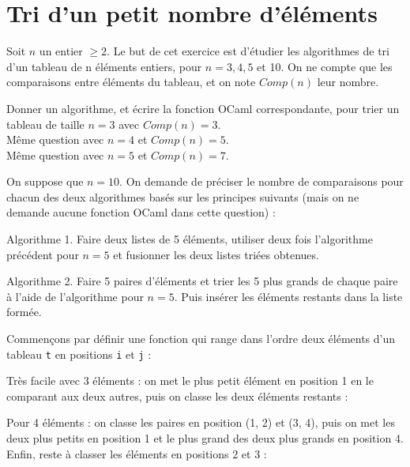 \renewcommand{\SourceFile}{1-parcours-de-tableaux/src/1-5.ml}

\section{Tri d'un petit nombre d'éléments}

Soit $n$ un entier $\geq 2$. Le but de cet exercice est d'étudier les algorithmes de tri d'un tableau de n éléments entiers, pour $n=3,4,5$ et 10. On ne compte que les comparaisons entre éléments du tableau, et on note $Comp(n)$ leur nombre.

\Q
Donner un algorithme, et écrire la fonction OCaml correspondante, pour trier un tableau de taille $n=3$ avec $Comp(n)=3$.\\
Même question avec $n=4$ et $Comp(n)=5$.\\
Même question avec $n=5$ et $Comp(n)=7$.

\Q
On suppose que $n=10$. On demande de préciser le nombre de comparaisons pour chacun des deux algorithmes basés sur les principes suivants (mais on ne demande aucune fonction OCaml dans cette question) :
\medskip

Algorithme 1. Faire deux listes de 5 éléments, utiliser deux fois l'algorithme précédent pour $n=5$ et fusionner les deux listes triées obtenues.
\medskip

Algorithme 2. Faire 5 paires d'éléments et trier les 5 plus grands de chaque paire à l'aide de l'algorithme pour $n=5$. Puis insérer les éléments restants dans la liste formée.

\Corrige
\vspace{.6cm}

Commençons par définir une fonction qui range dans l'ordre deux éléments d'un tableau \texttt{t} en positions \texttt{i} et \texttt{j} :



\Q
Très facile avec 3 éléments : on met le plus petit élément en position 1 en le comparant aux deux autres, puis on classe les deux éléments restants :



Pour 4 éléments : on classe les paires en position (1, 2) et (3, 4), puis on met les deux plus petits en position 1 et le plus grand des deux plus grands en position 4. Enfin, reste à classer les éléments en positions 2 et 3 :



